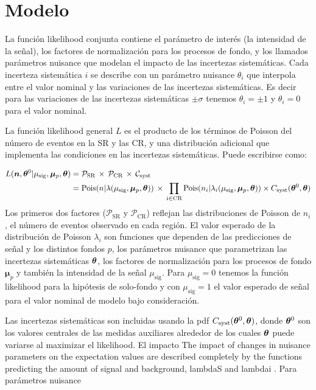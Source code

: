 \section{Modelo}

La función likelihood conjunta contiene el parámetro de interés (la intensidad
de la señal), los factores de normalización para los procesos de fondo, y los
llamados parámetros nuisance que modelan el impacto de las incertezas
sistemáticas. Cada incerteza sistemática $i$ se describe con un parámetro
nuisance $\theta_i$ que interpola entre el valor nominal y las variaciones de
las incertezas sistemáticas. Es decir para las variaciones de las incertezas
sistemáticas $\pm \sigma$ tenemos $\theta_i = \pm 1$ y $\theta_i = 0$ para el
valor nominal.

La función likelihood general $L$ es el producto de los términos de Poisson del
número de eventos en la SR y las CR, y una distribución adicional que implementa
las condiciones en las incertezas sistemáticas. Puede escribirse como:

\begin{align}
  L(\bm{n}, \bm{\theta}^0| \mu_\text{sig}, \bm{\mu}_p, \bm{\theta}) &=
  \mathcal{P}_\text{SR} \, \times \, \mathcal{P}_\text{CR} \, \times \,
  \mathcal{C}_\text{syst} \nonumber \\
  &= \operatorname{Pois}(n|\lambda(\mu_\text{sig}, \bm{\mu}_p, \bm{\theta})) \, \times \, \prod_{i \in \text{CR}}
  \operatorname{Pois}(n_i|\lambda_i(\mu_\text{sig}, \bm{\mu}_p, \bm{\theta})) \times C_\text{syst} (\bm{\theta}^0, \bm{\theta})
\end{align}
%
Los primeros dos factores ($\mathcal{P}_\text{SR}$ y $\mathcal{P}_\text{CR}$)
reflejan las distribuciones de Poisson de $n_i$, el número de eventos observado
en cada región. El valor esperado de la distribución de Poisson $\lambda_i$ son
funciones que dependen de las predicciones de señal y los distintos fondos $p$,
los parámetros nuisance que parametrizan las incertezas sistemáticas $\bm{\theta}$,
los factores de normalización para los procesos de fondo $\bm{\mu}_p$ y también
la intensidad de la señal $\mu_\text{sig}$. Para $\mu_\text{sig} = 0$ tenemos la
función likelihood para la hipótesis de solo-fondo y con $\mu_\text{sig} = 1$ el
valor esperado de señal para el valor nominal de modelo bajo consideración.

Las incertezas sistemáticas son incluidas usando la pdf
$C_\text{syst}(\bm{\theta}^0, \bm{\theta})$, donde $\bm{\theta}^0$ son los valores centrales
de las medidas auxiliares alrededor de los cuales $\bm{\theta}$ puede variarse al
maximizar el likelihood.
El impacto
The impact of changes in nuisance parameters on the expectation values are
described completely by the functions predicting the amount of signal and background,
lambdaS and lambdai . Para parámetros nuisance


